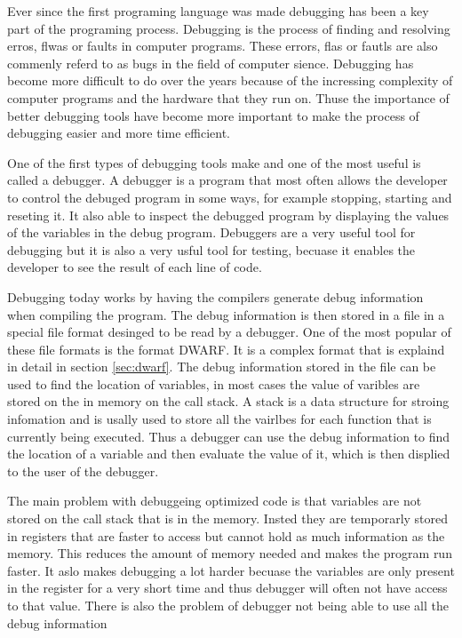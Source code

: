
Ever since the first programing language was made debugging has been a key part of the programing process.
Debugging is the process of finding and resolving erros, flwas or faults in computer programs.
These errors, flas or fautls are also commenly referd to as bugs in the field of computer sience.
Debugging has become more difficult to do over the years because of the incressing complexity of computer programs and the hardware that they run on.
Thuse the importance of better debugging tools have become more important to make the process of debugging easier and more time efficient.


One of the first types of debugging tools make and one of the most useful is called a debugger.
A debugger is a program that most often allows the developer to control the debuged program in some ways, for example stopping, starting and reseting it.
It also able to inspect the debugged program by displaying the values of the variables in the debug program.
Debuggers are a very useful tool for debugging but it is also a very usful tool for testing, becuase it enables the developer to see the result of each line of code.


Debugging today works by having the compilers generate debug information when compiling the program.
The debug information is then stored in a file in a special file format desinged to be read by a debugger.
One of the most popular of these file formats is the format \gls{DWARF}.
It is a complex format that is explaind in detail in section \ref{sec:dwarf}.
The debug information stored in the file can be used to find the location of variables, in most cases the value of varibles are stored on the in memory on the call stack.
A stack is a data structure for stroing infomation and is usally used to store all the vairlbes for each function that is currently being executed.
Thus a debugger can use the debug information to find the location of a variable and then evaluate the value of it, which is then displied to the user of the debugger.


The main problem with debuggeing optimized code is that variables are not stored on the call stack that is in the memory.
Insted they are temporarly stored in registers that are faster to access but cannot hold as much information as the memory.
This reduces the amount of memory needed and makes the program run faster.
It aslo makes debugging a lot harder becuase the variables are only present in the register for a very short time and thus debugger will often not have access to that value.
There is also the problem of debugger not being able to use all the debug information



